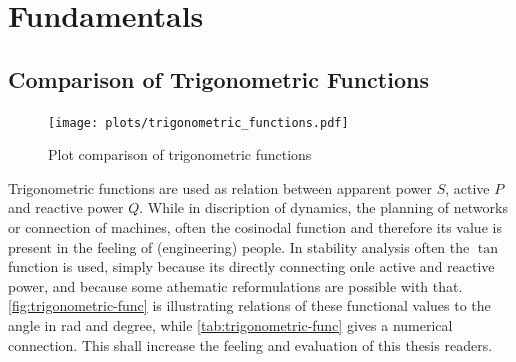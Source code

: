 
\label{app:appendix}


%  
%
%





\chapter{Fundamentals}

\section{Comparison of Trigonometric Functions}
\label{app:trogonometric-func-comp}

\begin{figure}[H]
    \centering
    \texttt{[image: plots/trigonometric\_functions.pdf]}
    \caption[Plot comparison of trigonometric functions]{Plot comparison of trigonometric functions}
    \label{fig:trigonometric-func}
\end{figure}

Trigonometric functions are used as relation between apparent power $S$, active $P$ and reactive power $Q$.
While in discription of dynamics, the planning of networks or connection of machines, often the cosinodal function and therefore its value is present in the feeling of (engineering) people.
In stability analysis often the $\tan$ function is used, simply because its directly connecting onle active and reactive power, and because some athematic reformulations are possible with that. 
\autoref{fig:trigonometric-func} is illustrating relations of these functional values to the angle in rad and degree, while \autoref{tab:trigonometric-func} gives a numerical connection.
This shall increase the feeling and evaluation of this thesis readers.


